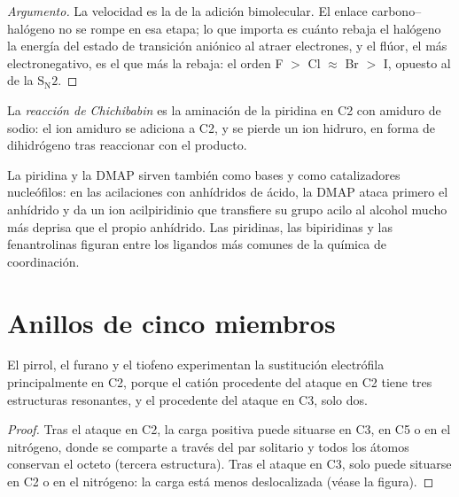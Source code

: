 \begin{proof}[Argumento]
La velocidad es la de la adición bimolecular. El enlace carbono--halógeno no se
rompe en esa etapa; lo que importa es cuánto rebaja el halógeno la energía del
estado de transición aniónico al atraer electrones, y el flúor, el más
electronegativo, es el que más la rebaja: el orden F $>$ Cl $\approx$ Br $>$ I, opuesto al de la $\mathrm S_\mathrm N2$.
\end{proof}

\begin{definition}\label{def:b3:heterocycles:chichibabin}
La \emph{reacción de Chichibabin} es la aminación de
la piridina en C2 con amiduro de sodio: el ion amiduro se adiciona a C2, y se pierde
un ion hidruro, en forma de dihidrógeno tras reaccionar con el producto.
\end{definition}

La piridina y la DMAP sirven también como bases y como catalizadores nucleófilos: en
las acilaciones con anhídridos de ácido, la DMAP ataca primero el anhídrido y da un
ion acilpiridinio que transfiere su grupo acilo al alcohol mucho más deprisa que
el propio anhídrido. Las piridinas, las bipiridinas y las fenantrolinas figuran entre los
ligandos más comunes de la química de coordinación.

\section{Anillos de cinco miembros}

\begin{proposition}\label{prop:b3:heterocycles:pyrrole-c2}
El pirrol, el furano y el tiofeno experimentan la sustitución electrófila principalmente en C2,
porque el catión procedente del ataque en C2 tiene tres estructuras resonantes, y el
procedente del ataque en C3, solo dos.
\end{proposition}

\begin{proof}
Tras el ataque en C2, la carga positiva puede situarse en C3, en C5 o en el nitrógeno,
donde se comparte a través del par solitario y todos los átomos conservan el octeto (tercera
estructura). Tras el ataque en C3, solo puede situarse en C2 o en el nitrógeno: la carga
está menos deslocalizada (véase la figura).
\end{proof}

